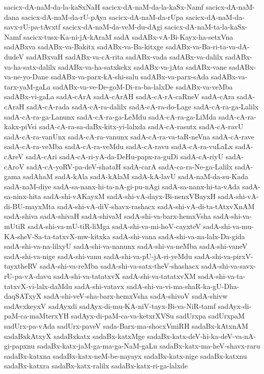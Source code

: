 {sacicx-dA-naM-da-la-kaSxNaH
sacicx-dA-naM-da-la-kaSx-Namf
sacicx-dA-naM-dana
sacicx-dA-naM-da-rU-pAya
sacicx-dA-naM-da-rUpa
sacicx-dA-naM-da-savx-rU-pa-tAvxtf
sacicx-dA-naM-da-veM-du-dAgi
sacicx-dA-naM-ta-la-kaSx-Namf
sacicx-tusx-Ka-ni-jA-kAraM
sadA
sadABx-vA-Bi-Kayx-ha-setxVna
sadABxva
sadABx-va-Bakitx
sadABx-va-Ba-kitxge
sadABx-va-Ba-ri-ta-va-dA-dudeV
sadABxvaH
sadABx-va-cA-rita
sadABx-vada
sadABx-va-dalilx
sadABx-va-ha-satx-dalilx
sadABx-va-ha-satxkekx
sadABx-va-jAta
sadABx-vane
sadABx-va-ne-yo-Dane
sadABx-va-parx-kA-shi-salu
sadABx-va-parx-sAda
sadABx-va-tarx-yaM-gaLa
sadABx-va-ve-De-goM-Di-ra-ba-lalxDe
sadABx-va-veMba
sadABx-vi-gaLa
sadA-cArA
sadA-cArAH
sadA-cA-rA-caRneV
sadA-cAra
sadA-cAraH
sadA-cA-rada
sadA-cA-ra-dalilx
sadA-cA-ra-do-Lage
sadA-cA-ra-ga-Lalilx
sadA-cA-ra-ga-Lanunx
sadA-cA-ra-ga-LeMdu
sadA-cA-ra-ga-LiMda
sadA-cA-ra-kakx-piVsi
sadA-cA-ra-sa-daBx-kitx-yi-lalxda
sadA-cA-rasutx
sadA-cA-ravU
sadA-cA-ra-vanUnx
sadA-cA-ra-vanunx
sadA-cA-ra-va-taR-neVna
sadA-cA-rave
sadA-cA-ra-veMba
sadA-cA-ra-veMdu
sadA-cA-ravu
sadA-cA-ra-vuLaLx
sadA-cAreV
sadA-cAri
sadA-cA-ri-yA-da-DeHu-papx-ra-guDi
sadA-cA-riyU
sadA-cAroV
sadA-cA-yoRV-pa-deV-shataH
sadA-carA
sadA-ca-ra-Ne-ga-Lalilx
sadA-gama
sadAhaM
sadA-kAla
sadA-kAlaM
sadA-kA-lavU
sadA-naM-da-su-Kada
sadA-naM-diye
sadA-sa-nanx-hi-ta-nA-gi-pu-nAgi
sadA-sa-nanx-hi-ta-vAda
sadA-sa-ninx-hita
sadA-shi-vAKayxM
sadA-shi-vA-dayx-Bi-nenxVBayxH
sadA-shi-vA-di-BU-mayxMta
sadA-shi-vA-diV-shavx-rashacx
sadA-shi-vA-di-ta-tAtxvXnAM
sadA-shiva
sadA-shivaH
sadA-shivaM
sadA-shi-va-barx-hemxVsha
sadA-shi-va-mUtiR
sadA-shi-va-mU-tiR-liMga
sadA-shi-va-mi-hoV-cayxteV
sadA-shi-va-mu-KA-sheV-Sa-ta-tatxvX-mw-kitxka
sadA-shi-vana
sadA-shi-va-na-lalx-Da-gida
sadA-shi-va-na-lilxyU
sadA-shi-va-nanunx
sadA-shi-va-neMba
sadA-shi-vaneV
sadA-shi-va-nige
sadA-shi-vanu
sadA-shi-va-pU-jA-ri-yeMdu
sadA-shi-va-pirxV-tayxtheRV
sadA-shi-va-reMba
sadA-shi-va-satx-theV-shashacx
sadA-shi-va-savx-rU-pa-vA-davu
sadA-shi-va-tatatxvX
sadA-shi-va-tatatxvXM
sadA-shi-va-ta-tatxvX-vi-lalx-daMdu
sadA-shi-vatavx
sadA-shi-va-vi-ma-shaR-ka-gU-Dha-daqSATxyX
sadA-shi-veV-sha-barx-hemxVsha
sadA-shivoV
sadA-shivw
sadAvxkeyxV
sadAyxdi
sadAyx-di-mu-KA-niV-tayx-Bi-va-NiR-tamf
sadAyx-di-paM-ca-maMterxYH
sadAyx-di-paM-ca-va-ketxrXVSu
sadUrxpa
sadUrxpaM
sadUrx-pa-vAda
sadUrx-paveV
sada-Barx-ma-shocxVmiRH
sadaBx-kAtxnAM
sadaBxkAtxyX
sadaBxkatx
sadaBx-katxMge
sadaBx-katx-deV-hi-ka-deV-va-nA-gi-papxnu
sadaBx-katx-jaM-ga-ma-ga-NaM-gaLu
sadaBx-katx-ma-heV-shavx-raru
sadaBx-katxna
sadaBx-katx-neM-be-nayayx
sadaBx-katx-nige
sadaBx-katxnu
sadaBx-katxra
sadaBx-katx-ralilx
sadaBx-katx-ri-ga-lalxde
}
